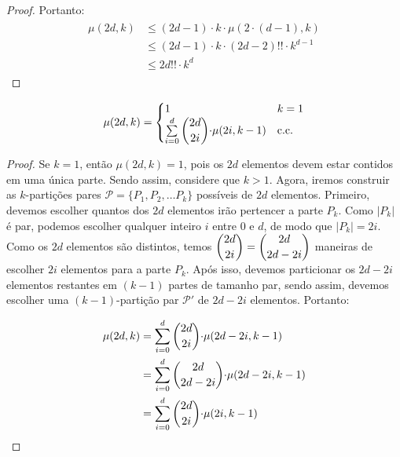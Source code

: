 \documentclass[12pt]{article}
\begin{document}
{\begin{proof}
 	Portanto: 
 	\begin{align}
 		\begin{split}
 			\mu(2d, k) &\leq (2d - 1) \cdot k \cdot \mu(2 {\cdot} (d - 1), k) \\
 			&\leq (2d - 1) \cdot k \cdot (2d - 2)!! \cdot k^{d-1} \\
 			&\leq 2d!! \cdot k^d
 		\end{split} 
 	\end{align} 
 	
 \end{proof} \newl
 
 
\begin{lema}   
	\label{lema3}
	\begin{equation}
		\mu(2d, k) =
		\begin{cases}
			1 & \text{$k = 1$} \\
			\sum\limits_{i = 0}^{d} \escolhe{2d}{2i} {\cdot} \mu(2i, k-1) & \text{c.c.} \\ 
		\end{cases}
	\end{equation} 
\end{lema}
 
\begin{proof} 
	Se $k=1$, então $\mu(2d, k) = 1$, pois os $2d$ elementos devem estar contidos em uma única parte. Sendo assim, considere que $k > 1$. Agora, iremos construir as $k$-partições pares $\mathcal{P}=\{P_1, P_2, \ldots P_k\}$ possíveis de $2d$ elementos. Primeiro, devemos escolher quantos dos $2d$ elementos irão pertencer a parte $P_k$. Como $|P_k|$ é par, podemos escolher qualquer inteiro $i$ entre $0$ e $d$, de modo que $|P_k| = 2i$. Como os $2d$ elementos são distintos, temos $\escolhe{2d}{2i} = \escolhe{2d}{2d - 2i}$ maneiras de escolher $2i$ elementos para a parte $P_k$. Após isso, devemos particionar os $2d - 2i$ elementos restantes em $(k-1)$ partes de tamanho par, sendo assim, devemos escolher uma $(k-1)$-partição par $\mathcal{P'}$ de $2d - 2i$ elementos. Portanto: 
	
	\begin{align}
		\begin{split}
			\mu(2d, k) &= \sum\limits_{i = 0}^{d}\escolhe{2d}{2i} {\cdot} \mu(2d - 2i, k-1) \\
			&= \sum\limits_{i = 0}^{d}\escolhe{2d}{2d - 2i} {\cdot} \mu(2d - 2i, k-1)\\
			&= \sum\limits_{i = 0}^{d}\escolhe{2d}{2i} {\cdot} \mu(2i, k-1)  
		\end{split} 
	\end{align}  
\end{proof} \newl


}
\end{document}
